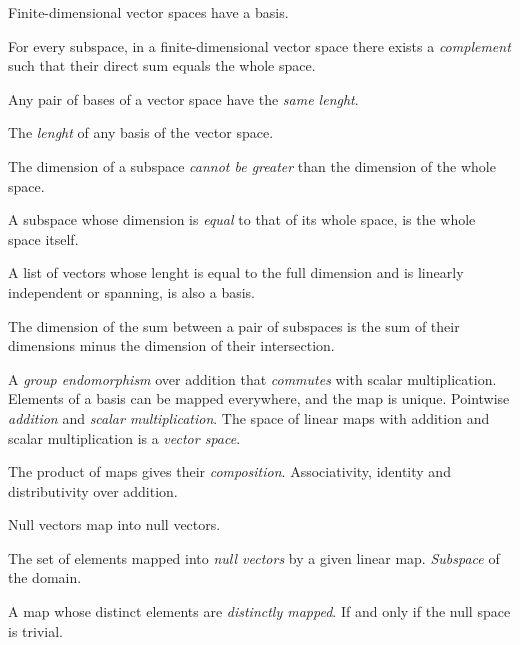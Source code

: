 \begin{multicols}{3}
  Finite-dimensional vector spaces have a basis.
  
  For every subspace, in a finite-dimensional vector space there exists a \textit{complement} such that their direct sum equals the whole space.
  
  Any pair of bases of a vector space have the \textit{same lenght}.
  
  The \textit{lenght} of any basis of the vector space.
  
  The dimension of a subspace \textit{cannot be greater} than the dimension of the whole space.
  
  A subspace whose dimension is \textit{equal} to that of its whole space, is the whole space itself.
  
  A list of vectors whose lenght is equal to the full dimension and is linearly independent or spanning, is also a basis.
  
  The dimension of the sum between a pair of subspaces is the sum of their dimensions minus the dimension of their intersection.

  A \textit{group endomorphism} over addition that \textit{commutes} with scalar multiplication.
  Elements of a basis can be mapped everywhere, and the map is unique.
  Pointwise \textit{addition} and \textit{scalar multiplication}.
  The space of linear maps with addition and scalar multiplication is a \textit{vector space}.

  The product of maps gives their \textit{composition}.
  Associativity, identity and distributivity over addition.

  Null vectors map into null vectors.

  The set of elements mapped into \textit{null vectors} by a given linear map.
  \textit{Subspace} of the domain.

  A map whose distinct elements are \textit{distinctly mapped}.
  If and only if the null space is trivial.


\end{multicols}
